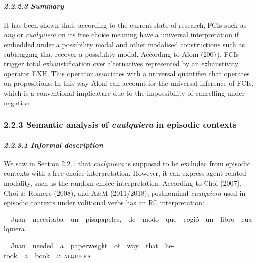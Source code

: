 \paragraph[2.2.2.3 Summary]{\textit{2.2.2.3 Summary}}
\begin{styleStandard}
It has been shown that, according to the current state of research, FCIs such as \textit{any} or \textit{cualquiera} on its free choice meaning have a universal interpretation if embedded under a possibility modal and other modalised constructions such as subtrigging that recover a possibility modal. According to Aloni (2007), FCIs trigger total exhaustification over alternatives represented by an exhaustivity operator EXH. This operator associates with a universal quantifier that operates on propositions. In this way Aloni can account for the universal inference of FCIs, which is a conventional implicature due to the impossibility of cancelling under negation.
\end{styleStandard}

\subsubsection[2.2.3 Semantic analysis of cualquiera in episodic contexts ]{\textbf{2.2.3 Semantic analysis of }\textbf{\textit{cualquiera}}\textbf{ in episodic contexts}\textbf{ }}
\paragraph[2.2.3.1 Informal description]{\textit{2.2.3.1 Informal description}}
\begin{styleStandard}
We saw in Section 2.2.1 that \textit{cualquiera} is supposed to be excluded from episodic contexts with a free choice interpretation. However, it can express agent-related modality, such as the random choice interpretation. According to Choi (2007), Choi \& Romero (2008), and A\&M (2011/2018), postnominal \textit{cualquiera} used in episodic contexts under volitional verbs has an RC interpretation:
\end{styleStandard}

\begin{styleStandard}
\ \ Juan\ \ necesitaba\ \ un\ \ pisapapeles,\ \ de\ \ modo\ \ que\ \ cogió\ \ un\ \ libro\ \ cualquiera
\end{styleStandard}

\begin{styleStandard}
\ \ Juan\ \ needed\ \ a\ \ paperweight\ \ of\ \ way\ \ that\ \ he-took\ \ a\ \ book\ \ \textsc{cualquiera}
\end{styleStandard}

